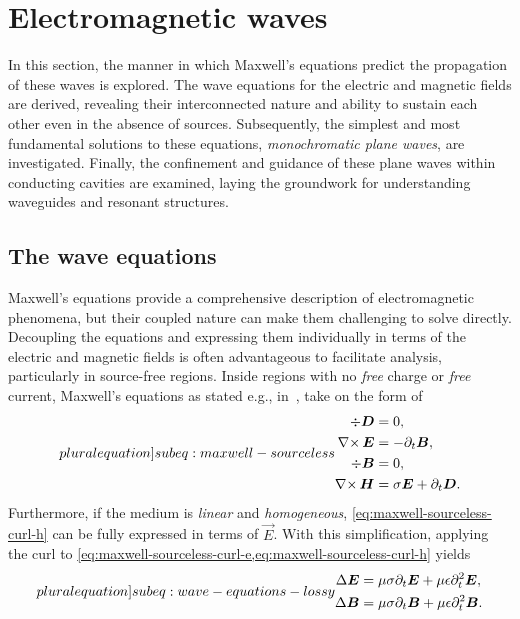 \documentclass[14pt,a4paper]{ntust_report}
\begin{document}
\section{Electromagnetic waves}
\label{section:electromagnetic-waves}
In this section, the manner in which Maxwell's equations predict the propagation of these waves is explored. The wave equations for the electric and magnetic fields are derived, revealing their interconnected nature and ability to sustain each other even in the absence of sources. Subsequently, the simplest and most fundamental solutions to these equations, \emph{monochromatic plane waves}, are investigated. Finally, the confinement and guidance of these plane waves within conducting cavities are examined, laying the groundwork for understanding waveguides and resonant structures.

\subsection{The wave equations}
\label{subsection:the-wave-equations}
Maxwell's equations provide a comprehensive description of electromagnetic phenomena, but their coupled nature can make them challenging to solve directly. Decoupling the equations and expressing them individually in terms of the electric and magnetic fields is often advantageous to facilitate analysis, particularly in source-free regions. Inside regions with no \emph{free} charge or \emph{free} current, Maxwell's equations as stated e.g., in~\parencite{griffiths:introduction-to-electrodynamics}, take on the form of\\
\begin{subequations}
    \label[pluralequation]{subeq:maxwell-sourceless}
    \begin{align}
        \label{eq:maxwell-sourceless-div-d}
        \div \vec D &= 0,
    \\
        \label{eq:maxwell-sourceless-curl-e}
        \curl \vec E &= -\partial_t\vec B,
    \\
        \label{eq:maxwell-sourceless-div-b}
        \div\vec B &= 0,
    \\
        \label{eq:maxwell-sourceless-curl-h}
        \curl\vec H &= \sigma\vec E + \partial_t\vec D.
    \end{align}
\end{subequations}
Furthermore, if the medium is \emph{linear} and \emph{homogeneous}, \cref{eq:maxwell-sourceless-curl-h} can be fully expressed in terms of $\vec E$. With this simplification, applying the curl to \cref{eq:maxwell-sourceless-curl-e,eq:maxwell-sourceless-curl-h} yields\\
\begin{subequations}
    \label[pluralequation]{subeq:wave-equations-lossy}
    \begin{align}
        \label{eq:wave-equation-e}
        \Delta\vec E &= \mu\sigma\partial_t\vec E + \mu\epsilon\partial^2_t\vec E,
    \\
        \label{eq:wave-equation-b}
        \Delta\vec B &= \mu\sigma\partial_t\vec B + \mu\epsilon\partial^2_t\vec B.
    \end{align}
\end{subequations}
\end{document}
